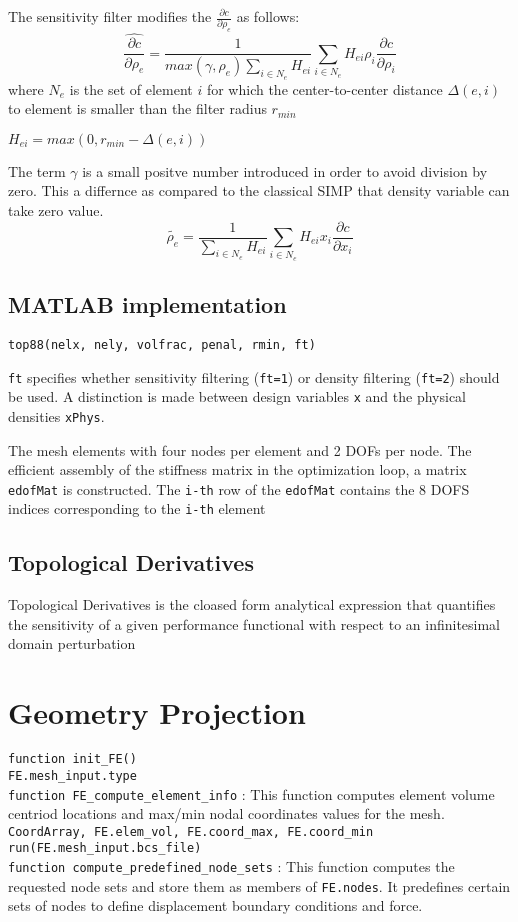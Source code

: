 \documentclass{article}
\newcommand{\code}[1]{\colorbox{light-gray}{\texttt{#1}}}
\begin{document}
The sensitivity filter modifies the $\frac{\partial c}{\partial \rho_e}$ as follows:
\begin{equation*}
    \widehat{\frac{\partial c}{\partial \rho_e}} = \frac{1}{max(\gamma, \rho_e)\sum_{i\in N_e}H_{ei}}\sum_{i \in N_e}H_{ei}\rho_{i}\frac{\partial c}{\partial \rho_i}
\end{equation*}
where $N_e$ is the set of element $i$ for which the center-to-center distance $\Delta(e,i)$ to element is smaller than the filter radius $r_{min}$

$H_{ei} = max(0,r_{min}-\Delta(e,i))$

The term $\gamma$ is a small positve number introduced in order to avoid division by zero. This a differnce as compared to the classical SIMP that density variable can take zero value.
\begin{equation*}
    \tilde{\rho_e} = \frac{1}{\sum_{i\in N_e}H_{ei}}\sum_{i \in N_e}H_{ei}x_i\frac{\partial c}{\partial x_i}
\end{equation*}
\subsection*{MATLAB implementation}
\code{top88(nelx, nely, volfrac, penal, rmin, ft)}

\code{ft} specifies whether sensitivity filtering (\code{ft=1}) or density filtering (\code{ft=2}) should be used. A distinction is made between design variables \code {x} and the physical densities \code{xPhys}.

The mesh elements with four nodes per element and 2 DOFs per node. The efficient assembly of the stiffness matrix in the optimization loop, a matrix \code{edofMat} is constructed. The \code{i-th} row of the \code{edofMat} contains the 8 DOFS indices corresponding to the \code{i-th} element
\subsection*{Topological Derivatives}
Topological Derivatives is the cloased form analytical expression that quantifies the sensitivity of a given performance functional with respect to an infinitesimal domain perturbation

\section{Geometry Projection}
\code{function init\_FE()} \\
\indent\code{FE.mesh\_input.type} \\
\indent\code{function FE\_compute\_element\_info} :  This function computes element volume centriod locations and max/min nodal coordinates values for the mesh. \\
\indent\indent\code{CoordArray, FE.elem\_vol, FE.coord\_max, FE.coord\_min}\\
\indent\code{run(FE.mesh\_input.bcs\_file)}\\
\indent\indent\code{function compute\_predefined\_node\_sets} : This function computes the requested node sets and store them as members of \code{FE.nodes}. It predefines certain sets of nodes to define displacement boundary conditions and force. 
\end{document}
